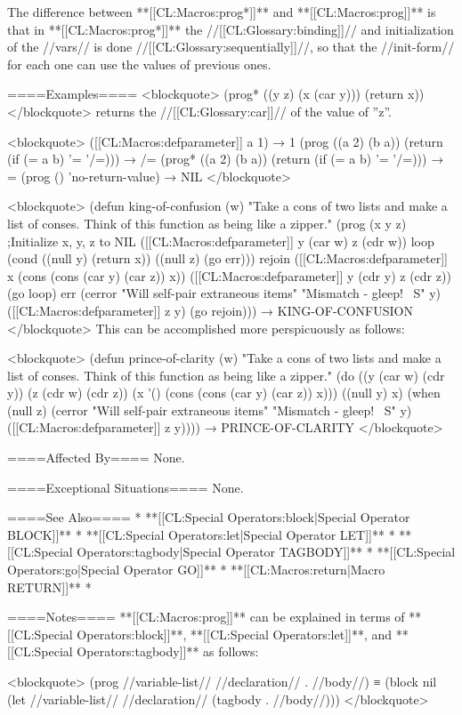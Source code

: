 The difference between **[[CL:Macros:prog*]]** and **[[CL:Macros:prog]]** is that in **[[CL:Macros:prog*]]** the //[[CL:Glossary:binding]]// and initialization of the //vars// is done //[[CL:Glossary:sequentially]]//, so that the //init-form// for each one can use the values of previous ones.

====Examples==== <blockquote> (prog* ((y z) (x (car y))) (return x)) </blockquote> returns the //[[CL:Glossary:car]]// of the value of ''z''.

<blockquote> ([[CL:Macros:defparameter]] a 1) → 1 (prog ((a 2) (b a)) (return (if (= a b) '= '/=))) → /= (prog* ((a 2) (b a)) (return (if (= a b) '= '/=))) → = (prog () 'no-return-value) → NIL </blockquote>

<blockquote> (defun king-of-confusion (w) "Take a cons of two lists and make a list of conses. Think of this function as being like a zipper." (prog (x y z) ;Initialize x, y, z to NIL ([[CL:Macros:defparameter]] y (car w) z (cdr w)) loop (cond ((null y) (return x)) ((null z) (go err))) rejoin ([[CL:Macros:defparameter]] x (cons (cons (car y) (car z)) x)) ([[CL:Macros:defparameter]] y (cdr y) z (cdr z)) (go loop) err (cerror "Will self-pair extraneous items" "Mismatch - gleep! ~S" y) ([[CL:Macros:defparameter]] z y) (go rejoin))) → KING-OF-CONFUSION </blockquote> This can be accomplished more perspicuously as follows:

<blockquote> (defun prince-of-clarity (w) "Take a cons of two lists and make a list of conses. Think of this function as being like a zipper." (do ((y (car w) (cdr y)) (z (cdr w) (cdr z)) (x '() (cons (cons (car y) (car z)) x))) ((null y) x) (when (null z) (cerror "Will self-pair extraneous items" "Mismatch - gleep! ~S" y) ([[CL:Macros:defparameter]] z y)))) → PRINCE-OF-CLARITY </blockquote>

====Affected By====
None.

====Exceptional Situations====
None.

====See Also====
 * **[[CL:Special Operators:block|Special Operator BLOCK]]**
 * **[[CL:Special Operators:let|Special Operator LET]]**
 * **[[CL:Special Operators:tagbody|Special Operator TAGBODY]]**
 * **[[CL:Special Operators:go|Special Operator GO]]**
 * **[[CL:Macros:return|Macro RETURN]]**
 * {\secref\Evaluation}

====Notes====
**[[CL:Macros:prog]]** can be explained in terms of **[[CL:Special Operators:block]]**, **[[CL:Special Operators:let]]**, and **[[CL:Special Operators:tagbody]]** as follows:

<blockquote> (prog //variable-list// //declaration// . //body//) ≡ (block nil (let //variable-list// //declaration// (tagbody . //body//))) </blockquote>

